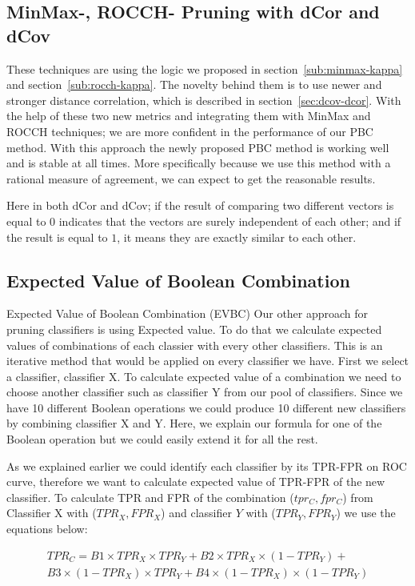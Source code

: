 \subsection{MinMax-, ROCCH- Pruning with dCor and dCov}
\label{sub:minmax-rocch-dcov}
These techniques are using the logic we proposed in section~\ref{sub:minmax-kappa} and section~\ref{sub:rocch-kappa}. The novelty behind them is to use newer and stronger distance correlation, which is described in section~\ref{sec:dcov-dcor}. With the help of these two new metrics and integrating them with MinMax and ROCCH techniques; we are more confident in the performance of our PBC method. With this approach the newly proposed PBC method is working well and is stable at all times. More specifically because we use this method with a rational measure of agreement, we can expect to get the reasonable results.

Here in both dCor and dCov; if the result of comparing two different vectors is equal to $0$ indicates that the vectors are surely independent of each other; and if the result is equal to $1$, it means they are exactly similar to each other.

\subsection{Expected Value of Boolean Combination}
\label{sub:expected-value}

Expected Value of Boolean Combination (EVBC)
Our other approach for pruning classifiers is using Expected value. To do that we calculate expected values of combinations of each classier with every other classifiers. This is an iterative method that would be applied on every classifier we have. First we select a classifier, classifier X. To calculate expected value of a combination we need to choose another classifier such as classifier Y from our pool of classifiers. Since we have 10 different Boolean operations we could produce 10 different new classifiers by combining classifier X and Y. Here, we explain our formula for one of the Boolean operation but we could easily extend it for all the rest.

As we explained earlier we could identify each classifier by its TPR-FPR on ROC curve, therefore we want to calculate expected value of TPR-FPR of the new classifier. To calculate TPR and FPR of the combination ($tpr_C, fpr_C$) from Classifier X with ($TPR_X, FPR_X$) and classifier $Y$ with ($TPR_Y, FPR_Y$) we use the equations below:

\begin{multline}
TPR_C = B1 \times TPR_X \times TPR_Y+B2\times TPR_X \times(1- TPR_Y)+\\B3\times(1- TPR_X)\times TPR_Y+B4\times(1- TPR_X)\times(1- TPR_Y)
\end{multline}

